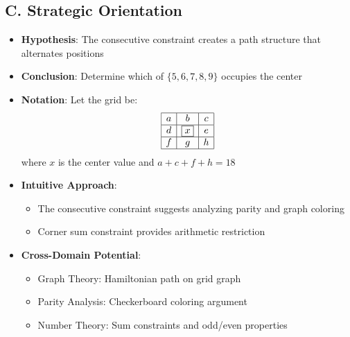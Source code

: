 \documentclass[11pt]{article}
\begin{document}
\begin{problemconfigbox}
\subsection*{C. Strategic Orientation}
\begin{itemize}[leftmargin=*]
    \item \textbf{Hypothesis}: The consecutive constraint creates a path structure that alternates positions
    \item \textbf{Conclusion}: Determine which of $\{5,6,7,8,9\}$ occupies the center
    \item \textbf{Notation}: Let the grid be:
    \[
    \begin{array}{|c|c|c|}
    \hline
    a & b & c \\
    \hline
    d & \boxed{x} & e \\
    \hline
    f & g & h \\
    \hline
    \end{array}
    \]
    where $x$ is the center value and $a+c+f+h=18$
    \item \textbf{Intuitive Approach}: 
    \begin{itemize}
        \item The consecutive constraint suggests analyzing parity and graph coloring
        \item Corner sum constraint provides arithmetic restriction
    \end{itemize}
    \item \textbf{Cross-Domain Potential}: 
    \begin{itemize}
        \item Graph Theory: Hamiltonian path on grid graph
        \item Parity Analysis: Checkerboard coloring argument
        \item Number Theory: Sum constraints and odd/even properties
    \end{itemize}
\end{itemize}
\end{problemconfigbox}
\end{document}
